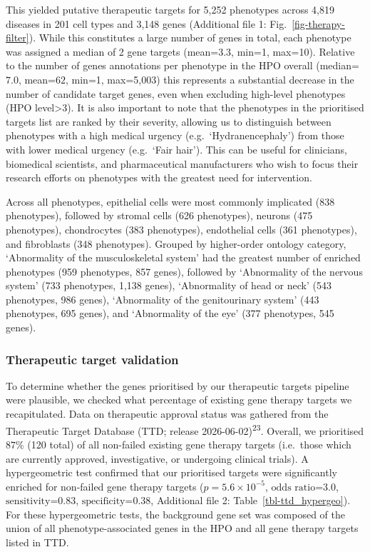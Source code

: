 \documentclass[
]{article}
\begin{document}
This yielded putative therapeutic targets for 5,252 phenotypes across
4,819 diseases in 201 cell types and 3,148 genes (Additional file 1:
Fig.~\ref{fig-therapy-filter}). While this constitutes a large number of
genes in total, each phenotype was assigned a median of 2 gene targets
(mean=\(3.3\), min=1, max=10). Relative to the number of genes
annotations per phenotype in the HPO overall (median=\(7.0\),
mean=\(62\), min=1, max=5,003) this represents a substantial decrease in
the number of candidate target genes, even when excluding high-level
phenotypes (HPO level\textgreater3). It is also important to note that
the phenotypes in the prioritised targets list are ranked by their
severity, allowing us to distinguish between phenotypes with a high
medical urgency (e.g.~`Hydranencephaly') from those with lower medical
urgency (e.g.~`Fair hair'). This can be useful for clinicians,
biomedical scientists, and pharmaceutical manufacturers who wish to
focus their research efforts on phenotypes with the greatest need for
intervention.

Across all phenotypes, epithelial cells were most commonly implicated
(838 phenotypes), followed by stromal cells (626 phenotypes), neurons
(475 phenotypes), chondrocytes (383 phenotypes), endothelial cells (361
phenotypes), and fibroblasts (348 phenotypes). Grouped by higher-order
ontology category, `Abnormality of the musculoskeletal system' had the
greatest number of enriched phenotypes (959 phenotypes, 857 genes),
followed by `Abnormality of the nervous system' (733 phenotypes, 1,138
genes), `Abnormality of head or neck' (543 phenotypes, 986 genes),
`Abnormality of the genitourinary system' (443 phenotypes, 695 genes),
and `Abnormality of the eye' (377 phenotypes, 545 genes).

\subsubsection{Therapeutic target
validation}\label{therapeutic-target-validation-1}

To determine whether the genes prioritised by our therapeutic targets
pipeline were plausible, we checked what percentage of existing gene
therapy targets we recapitulated. Data on therapeutic approval status
was gathered from the Therapeutic Target Database (TTD; release
2026-06-02)\textsuperscript{23}. Overall, we prioritised \(87\)\% (120
total) of all non-failed existing gene therapy targets (i.e.~those which
are currently approved, investigative, or undergoing clinical trials). A
hypergeometric test confirmed that our prioritised targets were
significantly enriched for non-failed gene therapy targets
(\(p=\)\(5.6 \times 10^{-5}\), \(\text{odds ratio=}\)\(3.0\),
\(\text{sensitivity}\)=\(0.83\), \(\text{specificity}\)=\(0.38\),
Additional file 2: Table~\ref{tbl-ttd_hypergeo}). For these
hypergeometric tests, the background gene set was composed of the union
of all phenotype-associated genes in the HPO and all gene therapy
targets listed in TTD.
\end{document}
